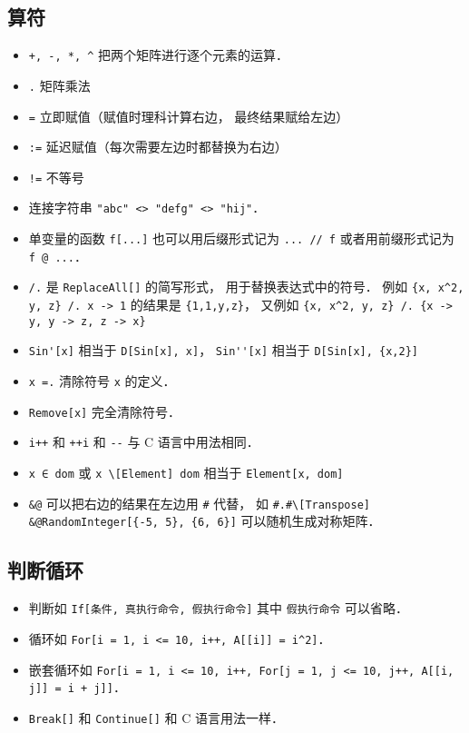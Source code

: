 \subsection{算符}
\begin{itemize}
\item \verb|+, -, *, ^| 把两个矩阵进行逐个元素的运算．
\item \verb|.| 矩阵乘法
\item \verb|=| 立即赋值（赋值时理科计算右边， 最终结果赋给左边）
\item \verb|:=| 延迟赋值（每次需要左边时都替换为右边）
\item \verb|!=| 不等号
\item 连接字符串 \verb|"abc" <> "defg" <> "hij"|．
\item 单变量的函数 \verb|f[...]| 也可以用后缀形式记为 \verb|... // f| 或者用前缀形式记为 \verb|f @ ...|．
\item \verb|/.| 是 \verb|ReplaceAll[]| 的简写形式， 用于替换表达式中的符号． 例如 \verb|{x, x^2, y, z} /. x -> 1| 的结果是 \verb|{1,1,y,z}|， 又例如 \verb|{x, x^2, y, z} /. {x -> y, y -> z, z -> x}|
\item \verb|Sin'[x]| 相当于 \verb|D[Sin[x], x]|， \verb|Sin''[x]| 相当于 \verb|D[Sin[x], {x,2}]|
\item \verb|x =.| 清除符号 \verb|x| 的定义．
\item \verb|Remove[x]| 完全清除符号．
\item \verb|i++| 和 \verb|++i| 和 \verb|--| 与 C 语言中用法相同．
\item \verb|x ∈ dom| 或 \verb|x \[Element] dom| 相当于 \verb|Element[x, dom]|
\item \verb|&@| 可以把右边的结果在左边用 \verb|#| 代替， 如 \verb|#.#\[Transpose] &@RandomInteger[{-5, 5}, {6, 6}]| 可以随机生成对称矩阵．
\end{itemize}

\subsection{判断循环}
\begin{itemize}
\item 判断如 \verb|If[条件, 真执行命令, 假执行命令]| 其中 \verb|假执行命令| 可以省略．
\item 循环如 \verb|For[i = 1, i <= 10, i++, A[[i]] = i^2]|．
\item 嵌套循环如 \verb|For[i = 1, i <= 10, i++, For[j = 1, j <= 10, j++, A[[i, j]] = i + j]]|．
\item \verb|Break[]| 和 \verb|Continue[]| 和 C 语言用法一样．
\end{itemize}

